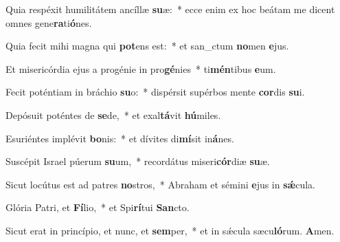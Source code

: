 \item Quia respéxit humilitátem ancíllæ \textbf{su}æ:~* ecce enim ex hoc beátam me dicent omnes gene\textbf{ra}ti\textbf{ó}nes.
\item Quia fecit mihi magna qui \textbf{pot}ens est:~* et san\_ctum \textbf{no}men \textbf{e}jus.
\item Et misericórdia ejus a progénie in pro\textbf{gé}nies~* ti\textbf{mén}tibus \textbf{e}um.
\item Fecit poténtiam in bráchio \textbf{su}o:~* dispérsit supérbos mente \textbf{cor}dis \textbf{su}i.
\item Depósuit poténtes de \textbf{se}de,~* et exal\textbf{tá}vit \textbf{hú}miles.
\item Esuriéntes implévit \textbf{bo}nis:~* et dívites di\textbf{mí}sit in\textbf{á}nes.
\item Suscépit Israel púerum \textbf{su}um,~* recordátus miseri\textbf{cór}diæ \textbf{su}æ.
\item Sicut locútus est ad patres \textbf{no}stros,~* Abraham et sémini \textbf{e}jus in \textbf{sǽ}cula.
\item Glória Patri, et \textbf{Fí}lio,~* et Spi\textbf{rí}tui \textbf{San}cto.
\item Sicut erat in princípio, et nunc, et \textbf{sem}per,~* et in sǽcula sæcu\textbf{ló}rum. \textbf{A}men.